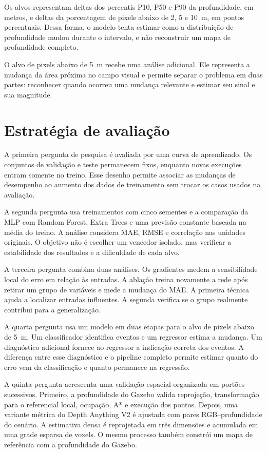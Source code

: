 Os alvos representam deltas dos percentis P10, P50 e P90 da profundidade, em metros, e deltas da porcentagem de pixels abaixo de 2, 5 e 10~m, em pontos percentuais. Dessa forma, o modelo tenta estimar como a distribuição de profundidade mudou durante o intervalo, e não reconstruir um mapa de profundidade completo.

O alvo de pixels abaixo de 5~m recebe uma análise adicional. Ele representa a mudança da área próxima no campo visual e permite separar o problema em duas partes: reconhecer quando ocorreu uma mudança relevante e estimar seu sinal e sua magnitude.

\section{Estratégia de avaliação}

A primeira pergunta de pesquisa é avaliada por uma curva de aprendizado. Os conjuntos de validação e teste permanecem fixos, enquanto novas execuções entram somente no treino. Esse desenho permite associar as mudanças de desempenho ao aumento dos dados de treinamento sem trocar os casos usados na avaliação.

A segunda pergunta usa treinamentos com cinco sementes e a comparação da MLP com Random Forest, Extra Trees e uma previsão constante baseada na média do treino. A análise considera MAE, RMSE e correlação nas unidades originais. O objetivo não é escolher um vencedor isolado, mas verificar a estabilidade dos resultados e a dificuldade de cada alvo.

A terceira pergunta combina duas análises. Os gradientes medem a sensibilidade local do erro em relação às entradas. A ablação treina novamente a rede após retirar um grupo de variáveis e mede a mudança do MAE. A primeira técnica ajuda a localizar entradas influentes. A segunda verifica se o grupo realmente contribui para a generalização.

A quarta pergunta usa um modelo em duas etapas para o alvo de pixels abaixo de 5~m. Um classificador identifica eventos e um regressor estima a mudança. Um diagnóstico adicional fornece ao regressor a indicação correta dos eventos. A diferença entre esse diagnóstico e o pipeline completo permite estimar quanto do erro vem da classificação e quanto permanece na regressão.

A quinta pergunta acrescenta uma validação espacial organizada em portões sucessivos. Primeiro, a profundidade do Gazebo valida reprojeção, transformação para o referencial local, ocupação, A* e execução dos pontos. Depois, uma variante métrica do Depth Anything V2 é ajustada com pares RGB--profundidade do cenário. A estimativa densa é reprojetada em três dimensões e acumulada em uma grade esparsa de voxels. O mesmo processo também constrói um mapa de referência com a profundidade do Gazebo.

